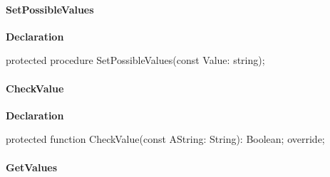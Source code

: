 \documentclass{report}
\newif\ifpdf
\begin{document}
\paragraph*{SetPossibleValues}\hspace*{\fill}

\label{PasDoc_OptionParser.TSetOption-SetPossibleValues}
\begin{list}{}{
\setlength{\itemindent}{0cm}
\setlength{\listparindent}{0cm}
\setlength{\leftmargin}{\evensidemargin}
\addtolength{\leftmargin}{\tmplength}
\settowidth{\labelsep}{X}
\addtolength{\leftmargin}{\labelsep}
\setlength{\labelwidth}{\tmplength}
}
\item[\textbf{Declaration}\hfill]
\ifpdf
\begin{flushleft}
\fi
\begin{ttfamily}
protected procedure SetPossibleValues(const Value: string);\end{ttfamily}

\ifpdf
\end{flushleft}
\fi

\end{list}
\paragraph*{CheckValue}\hspace*{\fill}

\label{PasDoc_OptionParser.TSetOption-CheckValue}
\begin{list}{}{
\setlength{\itemindent}{0cm}
\setlength{\listparindent}{0cm}
\setlength{\leftmargin}{\evensidemargin}
\addtolength{\leftmargin}{\tmplength}
\settowidth{\labelsep}{X}
\addtolength{\leftmargin}{\labelsep}
\setlength{\labelwidth}{\tmplength}
}
\item[\textbf{Declaration}\hfill]
\ifpdf
\begin{flushleft}
\fi
\begin{ttfamily}
protected function CheckValue(const AString: String): Boolean; override;\end{ttfamily}

\ifpdf
\end{flushleft}
\fi

\end{list}
\paragraph*{GetValues}\hspace*{\fill}
\end{document}
